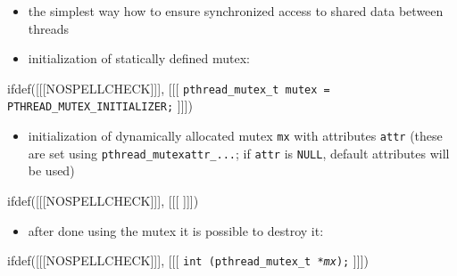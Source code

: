 \begin{slide}

\begin{itemize}
\item the simplest way how to ensure synchronized access to shared data between
threads
\item initialization of statically defined mutex:
\end{itemize}
ifdef([[[NOSPELLCHECK]]], [[[
\texttt{pthread\_mutex\_t mutex = PTHREAD\_MUTEX\_INITIALIZER;}
]]])
\begin{itemize}
\item initialization of dynamically allocated mutex \texttt{mx} with attributes
\texttt{attr} (these are set using \texttt{pthread\_mutexattr\_...};
if \texttt{attr} is \texttt{NULL}, default attributes will be used)
\end{itemize}
ifdef([[[NOSPELLCHECK]]], [[[
]]])
\begin{itemize}
\item after done using the mutex it is possible to destroy it:
\end{itemize}
ifdef([[[NOSPELLCHECK]]], [[[
\texttt{int (pthread\_mutex\_t *\emph{mx});}
]]])
\end{slide}

\label{MUTEXES}

